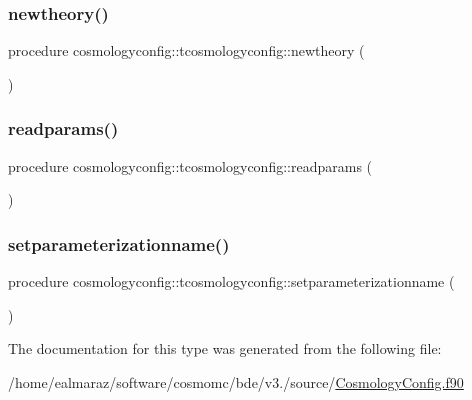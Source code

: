 \subsubsection{\texorpdfstring{newtheory()}{newtheory()}}
{\footnotesize\ttfamily procedure cosmologyconfig\+::tcosmologyconfig\+::newtheory (\begin{DoxyParamCaption}{ }\end{DoxyParamCaption})\hspace{0.3cm}{\ttfamily [private]}}

\mbox{\label{structcosmologyconfig_1_1tcosmologyconfig_acf7288501c5ffacddd9f7f3f6f913d85}} 
\subsubsection{\texorpdfstring{readparams()}{readparams()}}
{\footnotesize\ttfamily procedure cosmologyconfig\+::tcosmologyconfig\+::readparams (\begin{DoxyParamCaption}{ }\end{DoxyParamCaption})\hspace{0.3cm}{\ttfamily [private]}}

\mbox{\label{structcosmologyconfig_1_1tcosmologyconfig_a9f3d5c3dff9c2714e1b48e9ae05bd0a2}} 
\subsubsection{\texorpdfstring{setparameterizationname()}{setparameterizationname()}}
{\footnotesize\ttfamily procedure cosmologyconfig\+::tcosmologyconfig\+::setparameterizationname (\begin{DoxyParamCaption}{ }\end{DoxyParamCaption})\hspace{0.3cm}{\ttfamily [private]}}



The documentation for this type was generated from the following file\+:\begin{DoxyCompactItemize}
\item 
/home/ealmaraz/software/cosmomc/bde/v3./source/\mbox{\hyperlink{CosmologyConfig_8f90}{Cosmology\+Config.\+f90}}\end{DoxyCompactItemize}
